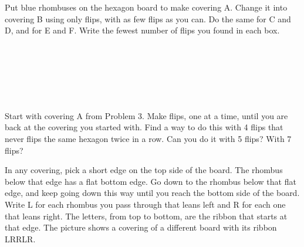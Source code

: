 \documentclass[12pt]{extarticle}
\begin{document}
\vspace{14pt}

\newpage
\prob Put blue rhombuses on the hexagon board to make covering A. Change it into covering B using only flips, with as few flips as you can. Do the same for C and D, and for E and F. Write the fewest number of flips you found in each box.

\vspace{16pt}
\begin{minipage}[t]{4.05in}
\vspace{0pt}
\end{minipage}%
\begin{minipage}[t]{3.45in}
\vspace{0pt}
\centering
{}\hspace{0.07in}\raisebox{0.75in}{\onearrow}\hspace{0.07in}\\[8pt]
\abox\\[22pt]
\hspace{0.07in}\raisebox{0.75in}{\onearrow}\hspace{0.07in}\\[8pt]
\abox\\[22pt]
\hspace{0.07in}\raisebox{0.75in}{\onearrow}\hspace{0.07in}\\[8pt]
\abox
\end{minipage}

\newpage
\prob Start with covering A from Problem 3. Make flips, one at a time, until you are back at the covering you started with. Find a way to do this with 4 flips that never flips the same hexagon twice in a row. Can you do it with 5 flips? With 7 flips?

\vspace{2pt}

\vspace{16pt}
\prob In any covering, pick a short edge on the top side of the board. The rhombus below that edge has a flat bottom edge. Go down to the rhombus below that flat edge, and keep going down this way until you reach the bottom side of the board. Write L for each rhombus you pass through that leans left and R for each one that leans right. The letters, from top to bottom, are the ribbon that starts at that edge. The picture shows a covering of a different board with its ribbon LRRLR.
\end{document}
